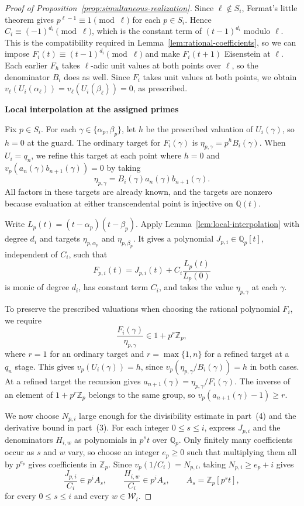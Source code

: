 \documentclass{article}
\newcommand{\proofheading}[1]{%
    \par\addvspace{\smallskipamount}%
    \noindent\textbf{#1}\par\nobreak
}
\theoremstyle{remark}
\begin{document}
\begin{proof}[Proof of Proposition~\ref{prop:simultaneous-realization}]
    Since $\ell \notin S_i$, Fermat's little theorem gives $p^{\ell - 1} \equiv 1 \pmod{\ell}$ for each $p \in S_i$.
    Hence $C_i \equiv (-1)^{d_i} \pmod{\ell}$, which is the constant term of $(t - 1)^{d_i}$ modulo $\ell$.
    This is the compatibility required in Lemma~\ref{lem:rational-coefficients}, so we can impose $F_i(t) \equiv (t - 1)^{d_i} \pmod{\ell}$ and make $F_i(t + 1)$ Eisenstein at $\ell$.
    Each earlier $F_h$ takes $\ell$-adic unit values at both points over $\ell$, so the denominator $B_i$ does as well.
    Since $F_i$ takes unit values at both points, we obtain $v_\ell(U_i(\alpha_\ell)) = v_\ell(U_i(\beta_\ell)) = 0$, as prescribed.

    \proofheading{Local interpolation at the assigned primes}
    Fix $p \in S_i$.
    For each $\gamma \in \{\alpha_p, \beta_p\}$, let $h$ be the prescribed valuation of $U_i(\gamma)$, so $h = 0$ at the guard.
    The ordinary target for $F_i(\gamma)$ is $\eta_{p, \gamma} = p^h B_i(\gamma)$.
    When $U_i = q_n$, we refine this target at each point where $h = 0$ and $v_p(a_n(\gamma)b_{n + 1}(\gamma)) = 0$ by taking
    \[
        \eta_{p, \gamma} = B_i(\gamma)a_n(\gamma)b_{n + 1}(\gamma).
    \]
    All factors in these targets are already known, and the targets are nonzero because evaluation at either transcendental point is injective on $\mathbb{Q}(t)$.

    Write $L_p(t) = (t - \alpha_p)(t - \beta_p)$.
    Apply Lemma~\ref{lem:local-interpolation} with degree $d_i$ and targets $\eta_{p, \alpha_p}$ and $\eta_{p, \beta_p}$.
    It gives a polynomial $J_{p, i} \in \mathbb{Q}_p[t]$, independent of $C_i$, such that
    \[
        F_{p, i}(t) = J_{p, i}(t) + C_i \frac{L_p(t)}{L_p(0)}
    \]
    is monic of degree $d_i$, has constant term $C_i$, and takes the value $\eta_{p, \gamma}$ at each $\gamma$.

    To preserve the prescribed valuations when choosing the rational polynomial $F_i$, we require
    \[
        \frac{F_i(\gamma)}{\eta_{p, \gamma}} \in 1 + p^r\mathbb{Z}_p,
    \]
    where $r = 1$ for an ordinary target and $r = \max\{1, n\}$ for a refined target at a $q_n$ stage.
    This gives $v_p(U_i(\gamma)) = h$, since $v_p(\eta_{p, \gamma}/B_i(\gamma)) = h$ in both cases.
    At a refined target the recursion gives $a_{n + 1}(\gamma) = \eta_{p, \gamma}/F_i(\gamma)$.
    The inverse of an element of $1 + p^r\mathbb{Z}_p$ belongs to the same group, so $v_p(a_{n + 1}(\gamma) - 1) \ge r$.

    We now choose $N_{p, i}$ large enough for the divisibility estimate in part~(4) and the derivative bound in part~(3).
    For each integer $0 \le s \le i$, express $J_{p, i}$ and the denominators $H_{i, w}$ as polynomials in $p^s t$ over $\mathbb{Q}_p$.
    Only finitely many coefficients occur as $s$ and $w$ vary, so choose an integer $e_p \ge 0$ such that multiplying them all by $p^{e_p}$ gives coefficients in $\mathbb{Z}_p$.
    Since $v_p(1/C_i) = N_{p, i}$, taking $N_{p, i} \ge e_p + i$ gives
    \[
        \frac{J_{p, i}}{C_i} \in p^i A_s, \qquad \frac{H_{i, w}}{C_i} \in p^i A_s,
        \qquad A_s = \mathbb{Z}_p[p^s t],
    \]
    for every $0 \le s \le i$ and every $w \in \mathcal{W}_i$.


\end{proof}
\end{document}
